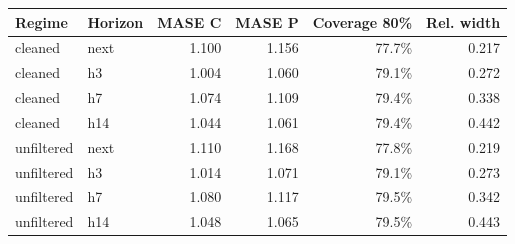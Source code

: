\begin{tabular}{@{}llrrrr@{}}\toprule
Regime & Horizon & MASE C & MASE P & Coverage 80\% & Rel. width\\\midrule
cleaned & next & 1.100 & 1.156 & 77.7\% & 0.217 \\
cleaned & h3 & 1.004 & 1.060 & 79.1\% & 0.272 \\
cleaned & h7 & 1.074 & 1.109 & 79.4\% & 0.338 \\
cleaned & h14 & 1.044 & 1.061 & 79.4\% & 0.442 \\
unfiltered & next & 1.110 & 1.168 & 77.8\% & 0.219 \\
unfiltered & h3 & 1.014 & 1.071 & 79.1\% & 0.273 \\
unfiltered & h7 & 1.080 & 1.117 & 79.5\% & 0.342 \\
unfiltered & h14 & 1.048 & 1.065 & 79.5\% & 0.443 \\
\bottomrule\end{tabular}
